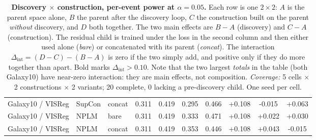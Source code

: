 \begin{table}[t]
\begin{tabular}{lllccccccc}
Galaxy10 / VISReg & SupCon & concat & 0.311 & 0.419 & 0.295 & 0.466 & +0.108 & -0.015 & +0.063 \\
Galaxy10 / VISReg & NPLM & bare & 0.311 & 0.419 & 0.333 & 0.471 & +0.108 & +0.022 & +0.030 \\
Galaxy10 / VISReg & NPLM & concat & 0.311 & 0.419 & 0.353 & 0.446 & +0.108 & +0.043 & -0.015 \\
\bottomrule
\end{tabular}
\caption{\textbf{Discovery $\times$ construction, per-event power at $\alpha{=}0.05$.} Each row is one $2\times2$: $A$ is the parent space alone, $B$ the parent after the discovery loop, $C$ the construction built on the parent \emph{without} discovery, and $D$ both together. The two main effects are $B-A$ (discovery) and $C-A$ (construction). The residual child is trained under the loss in the second column and then either used alone (\emph{bare}) or concatenated with its parent (\emph{concat}). The interaction $\Delta_{\text{int}}=(D-C)-(B-A)$ is zero if the two simply add, and positive only if they do more together than apart. Bold marks $\Delta_{\text{int}}>0.10$. Note that the two largest \emph{totals} in the table (both Galaxy10) have near-zero interaction: they are main effects, not composition. \emph{Coverage:} 5 cells $\times$ 2 constructions $\times$ 2 variants; 20 complete, 0 lacking a pre-discovery child. One seed per cell.}
\label{tab:2x2}
\end{table}
